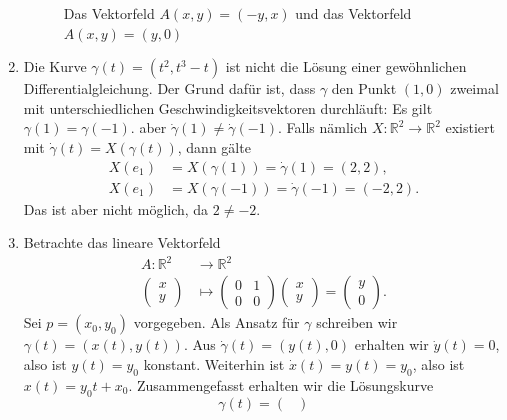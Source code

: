 \documentclass[../main.tex]{subfiles}
\begin{document}
\begin{examples}
\begin{enumerate}[(1)]
\begin{figure}[htb]
\begin{minipage}{0.50\textwidth}
        \end{minipage}%
        \caption{Das Vektorfeld $A(x, y) = (-y, x)$ und das
        Vektorfeld $A(x, y) = (y, 0)$}%
        \label{fig:vectorfields-examples}
      \end{figure}
    \item Die Kurve $\gamma(t) = (t^2, t^3 - t)$ ist
      nicht die Lösung einer gewöhnlichen Differentialgleichung.
      Der Grund dafür ist, dass $\gamma$ den Punkt
      $(1, 0)$ zweimal mit unterschiedlichen Geschwindigkeitsvektoren
      durchläuft: Es gilt $\gamma(1) = \gamma(-1)$.
      aber $\dot \gamma(1) \neq \dot \gamma(-1)$.
      Falls nämlich $X \colon \mathbb{R}^2 \to \mathbb{R}^2$ 
      existiert mit $\dot \gamma (t) = X ( \gamma(t))$,
      dann gälte
      \begin{align*}
        X(e_1) &= X(\gamma(1)) = \dot \gamma(1) = (2, 2),\\
        X(e_1) &= X(\gamma(-1)) = \dot \gamma(-1) = (-2, 2).
      \end{align*}
      Das ist aber nicht möglich, da $2 \neq -2$.
    \item Betrachte das lineare Vektorfeld
      \begin{align*}
        A \colon \mathbb{R}^2 & \to \mathbb{R}^2 \\
        \begin{pmatrix}
          x \\ y
        \end{pmatrix}
         & \mapsto 
         \begin{pmatrix}
           0 & 1 \\ 0 & 0
         \end{pmatrix}
         \begin{pmatrix}
           x \\ y
         \end{pmatrix}
         =
         \begin{pmatrix}
           y \\ 0
         \end{pmatrix}.
      \end{align*}
      Sei $p = (x_0, y_0)$ vorgegeben.
      Als Ansatz für $\gamma$
      schreiben wir $\gamma(t) = (x(t),
      y(t))$.
      Aus $\dot \gamma(t) = (y(t), 0)$ erhalten wir
      $\dot y (t) = 0$, also ist $y(t) = y_0$ konstant.
      Weiterhin ist
      $\dot x(t) = y(t) = y_0$, also ist
      $x(t) = y_0 t + x_0$. Zusammengefasst erhalten
      wir die Lösungskurve
      \[
        \gamma(t) =
        \begin{pmatrix}

\end{pmatrix}\]
\end{enumerate}
\end{examples}
\end{document}
